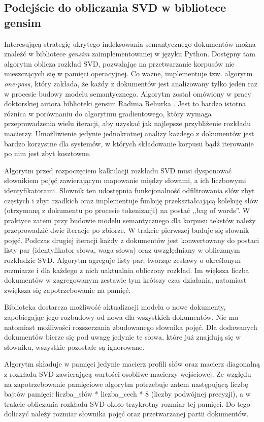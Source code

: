 \documentclass{pracamgr}
\begin{document}
\subsection{Podejście do obliczania SVD w bibliotece gensim}
Interesującą strategię ukrytego indeksowania semantycznego dokumentów można znaleźć w bibliotece \textit{gensim} \cite{gensim} zaimplementowanej w języku Python. Dostępny tam algorytm oblicza rozkład SVD, pozwalając na przetwarzanie korpusów nie mieszczących się w pamięci operacyjnej. Co ważne, implementuje tzw. algorytm \textit{one-pass}, który zakłada, że każdy z dokumentów jest analizowany tylko jeden raz w procesie budowy modelu semantycznego. Algorytm został omówiony w pracy doktorskiej autora biblioteki gensim Radima Rehurka \cite{rehurek}. Jest to bardzo istotna różnica w porównaniu do algorytmu gradientowego, który wymaga przeprowadzenia wielu iteracji, aby uzyskać jak najlepsze przybliżenie rozkładu macierzy. Umożliwienie jedynie jednokrotnej analizy każdego z dokumentów jest bardzo korzystne dla systemów, w których składowanie korpusu bądź iterowanie po nim jest zbyt kosztowne.

Algorytm przed rozpoczęciem kalkulacji rozkładu SVD musi dysponować słownikiem pojęć zawierającym mapowanie między słowami, a ich liczbowymi identyfikatorami. Słownik ten udostępnia funkcjonalność odfiltrowania słów zbyt częstych i zbyt rzadkich oraz implementuje funkcję przekształcającą kolekcję słów (otrzymaną z dokumentu po procesie tokenizacji) na postać ,,bag of words''. W praktyce zatem przy budowie modelu semantycznego dla korpusu tekstów należy przeprowadzić dwie iteracje po zbiorze. W trakcie pierwszej buduje się słownik pojęć. Podczas drugiej iteracji każdy z dokumentów jest konwertowany do postaci listy par (identyfikator słowa, waga słowa) oraz uwzględniany w obliczanym rozkładzie SVD. Algorytm agreguje listy par, tworząc zestawy o określonym rozmiarze i dla każdego z nich uaktualnia obliczony rozkład. Im większa liczba dokumentów w zagregowanym zestawie tym krótszy czas działania, natomiast zwiększa się zapotrzebowanie na pamięć.

Biblioteka dostarcza możliwość aktualizacji modelu o nowe dokumenty, zapobiegając jego rozbudowy od nowa dla wszystkich dokumentów. Nie ma natomiast możliwości rozszerzania zbudowanego słownika pojęć. Dla dodawanych dokumentów bierze się pod uwagę jedynie te słowa, które już znajdują się w słowniku, wszystkie pozostałe są ignorowane.

Algorytm składuje w pamięci jedynie macierz profili słów oraz macierz diagonalną z rozkładu SVD zawierającą wartości osobliwe macierzy wejściowej.  Ze względu na zapotrzebowanie pamięciowe algorytm potrzebuje zatem następującą liczbę bajtów pamięci: liczba\_słów * liczba\_cech * 8 (liczby podwójnej precyzji), a w trakcie obliczania rozkładu SVD około trzykrotny rozmiar tej pamięci. Do tego doliczyć należy rozmiar słownika pojęć oraz przetwarzanej partii dokumentów.
\end{document}
